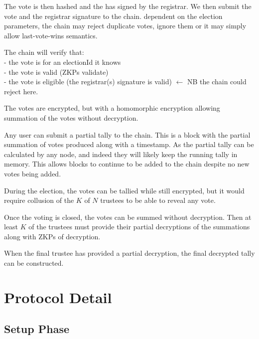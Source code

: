 {    The vote is then hashed and the has signed by the registrar. We then submit the vote and the registrar signature to the chain. dependent on the election parameters, the chain may reject duplicate votes, ignore them or it may simply allow last-vote-wins semantics.

    The chain will verify that: \\
    - the vote is for an electionId it knows \\
    - the vote is valid (ZKPs validate) \\
    - the vote is eligible (the registrar(s) signature is valid) $\leftarrow$ NB the chain could reject here.

    The votes are encrypted, but with a homomorphic encryption allowing summation of the votes without decryption.

    Any user can submit a partial tally to the chain. This is a block with the partial summation of votes produced along with a timestamp. As the partial tally can be calculated by any node, and indeed they will likely keep the running tally in memory. This allows blocks to continue to be added to the chain despite no new votes being added.

    During the election, the votes can be tallied while still encrypted, but it would require collusion of the $K$ of $N$ trustees to be able to reveal any vote.

    Once the voting is closed, the votes can be summed without decryption. Then at least $K$ of the trustees must provide their partial decryptions of the summations along with ZKPs of decryption.

    When the final trustee has provided a partial decryption, the final decrypted tally can be constructed.
}

\section{Protocol Detail}
\label{ch:astris:detail}


\subsection{Setup Phase}
\label{ch:astris:detail:setup}

